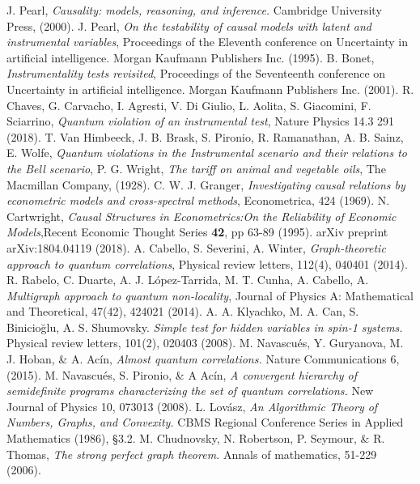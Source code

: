 \documentclass[letterpaper]{article}
\begin{document}
\begin{thebibliography}{}
     J. Pearl, 
        {\em Causality: models, reasoning, and inference.}
        Cambridge University Press, (2000).
     J. Pearl, 
        {\em On the testability of causal models with latent and instrumental variables}, 
        Proceedings of the Eleventh conference on Uncertainty in artificial
        intelligence. Morgan Kaufmann Publishers Inc. (1995).
     B. Bonet, {\em Instrumentality tests revisited},
        Proceedings of the Seventeenth conference on Uncertainty in artificial
        intelligence. Morgan Kaufmann Publishers Inc. (2001).
     R. Chaves, G. Carvacho, I. Agresti, V. Di Giulio, L. Aolita,
        S. Giacomini, F. Sciarrino, 
        {\em Quantum violation of an instrumental test}, 
        Nature Physics 14.3 291 (2018).
      T. Van Himbeeck, J. B. Brask, S. Pironio, R. Ramanathan, A. B. Sainz, E. Wolfe, 
        {\em Quantum violations in the Instrumental scenario and their relations to the Bell scenario},
     P. G. Wright, \emph{The tariff on animal and vegetable oils}, The Macmillan Company, (1928).
     C. W. J. Granger, \emph{Investigating causal relations by econometric models and cross-spectral methods}, Econometrica, 424 (1969).
     N. Cartwright, \emph{Causal Structures in Econometrics:On the Reliability of Economic Models},Recent Economic Thought Series \textbf{42}, pp 63-89 (1995).
        arXiv preprint arXiv:1804.04119 (2018).
      A. Cabello, S. Severini, A. Winter,
         {\em Graph-theoretic approach to quantum correlations}, 
         Physical review letters, 112(4), 040401 (2014).
      R. Rabelo, C. Duarte, A. J.  López-Tarrida, M. T. Cunha, A. Cabello, A. 
         {\em Multigraph approach to quantum non-locality},
         Journal of Physics A: Mathematical and Theoretical, 47(42), 424021
         (2014).
      A. A. Klyachko, M. A. Can, S. Binicioğlu, A. S. Shumovsky.
         {\em Simple test for hidden variables in spin-1 systems.}
         Physical review letters, 101(2), 020403 (2008).
      M. Navascués, Y. Guryanova, M. J. Hoban, \& A. Acín, 
         {\em Almost quantum correlations.}
         Nature Communications 6, (2015).
      M. Navascués, S. Pironio, \& A Acín, 
         {\em A convergent hierarchy of semidefinite programs characterizing the
         set of quantum correlations.}
         New Journal of Physics 10, 073013 (2008).
      L. Lovász, 
         {\em An Algorithmic Theory of Numbers, Graphs, and Convexity.}
         CBMS Regional Conference Series in Applied Mathematics (1986), §3.2.
      M. Chudnovsky, N. Robertson, P. Seymour, \& R. Thomas, 
         {\em The strong perfect graph theorem.} 
         Annals of mathematics, 51-229 (2006).
         


\end{thebibliography}
\end{document}
